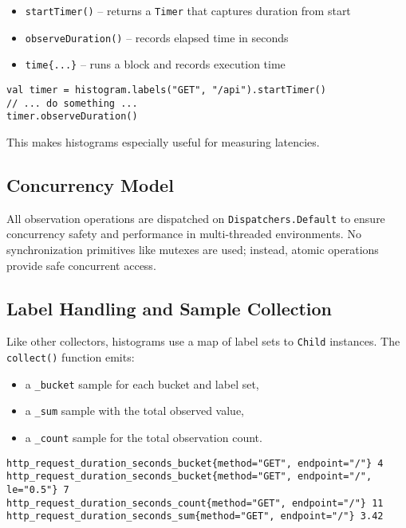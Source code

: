 \begin{itemize}
    \item \texttt{startTimer()} – returns a \texttt{Timer} that captures duration from start
    \item \texttt{observeDuration()} – records elapsed time in seconds
    \item \texttt{time\{...\}} – runs a block and records execution time
\end{itemize}

\begin{verbatim}
val timer = histogram.labels("GET", "/api").startTimer()
// ... do something ...
timer.observeDuration()
\end{verbatim}

This makes histograms especially useful for measuring latencies.

\subsection{Concurrency Model}

All observation operations are dispatched on \texttt{Dispatchers.Default} to ensure concurrency safety and performance in multi-threaded environments. No synchronization primitives like mutexes are used; instead, atomic operations provide safe concurrent access.

\subsection{Label Handling and Sample Collection}

Like other collectors, histograms use a map of label sets to \texttt{Child} instances. The \texttt{collect()} function emits:

\begin{itemize}
    \item a \texttt{\_bucket} sample for each bucket and label set,
    \item a \texttt{\_sum} sample with the total observed value,
    \item a \texttt{\_count} sample for the total observation count.
\end{itemize}

\begin{verbatim}
http_request_duration_seconds_bucket{method="GET", endpoint="/"} 4
http_request_duration_seconds_bucket{method="GET", endpoint="/", le="0.5"} 7
http_request_duration_seconds_count{method="GET", endpoint="/"} 11
http_request_duration_seconds_sum{method="GET", endpoint="/"} 3.42
\end{verbatim}

